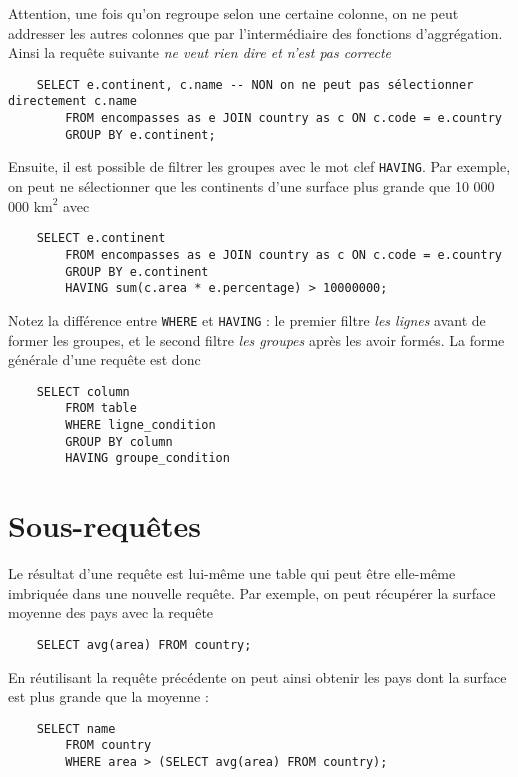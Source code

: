 Attention, une fois qu'on regroupe selon une certaine colonne, on ne peut addresser les autres colonnes que par l'intermédiaire des fonctions d'aggrégation. Ainsi la requête suivante \textit{ne veut rien dire et n'est pas correcte} 

\begin{verbatim}
    SELECT e.continent, c.name -- NON on ne peut pas sélectionner directement c.name
        FROM encompasses as e JOIN country as c ON c.code = e.country
        GROUP BY e.continent;
\end{verbatim}

Ensuite, il est possible de filtrer les groupes avec le mot clef \texttt{HAVING}. Par exemple, on peut ne sélectionner que les continents d'une surface plus grande que 10 000 000 $ \textrm{km}^2 $ avec 

\begin{verbatim}
    SELECT e.continent
        FROM encompasses as e JOIN country as c ON c.code = e.country
        GROUP BY e.continent
        HAVING sum(c.area * e.percentage) > 10000000;
\end{verbatim}

Notez la différence entre \texttt{WHERE} et \texttt{HAVING} : le premier filtre \textit{les lignes} avant de former les groupes, et le second filtre \textit{les groupes} après les avoir formés. La forme générale d'une requête est donc 

\begin{verbatim}
    SELECT column
        FROM table
        WHERE ligne_condition
        GROUP BY column
        HAVING groupe_condition
\end{verbatim}

\section{Sous-requêtes}

Le résultat d'une requête est lui-même une table qui peut être elle-même imbriquée dans une nouvelle requête. Par exemple, on peut récupérer la surface moyenne des pays avec la requête 

\begin{verbatim}
    SELECT avg(area) FROM country;
\end{verbatim}

En réutilisant la requête précédente on peut ainsi obtenir les pays dont la surface est plus grande que la moyenne : 

\begin{verbatim}
    SELECT name
        FROM country
        WHERE area > (SELECT avg(area) FROM country);
\end{verbatim}

